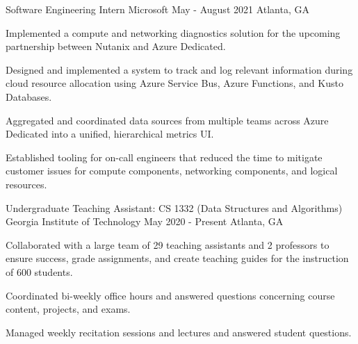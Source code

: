 

\begin{cventries}

\cventry
{Software Engineering Intern}
{Microsoft}
{May - August 2021}
{Atlanta, GA}
{
\begin{cvitems}
    \item Implemented a compute and networking diagnostics solution for the upcoming partnership between Nutanix and Azure Dedicated.
    \item Designed and implemented a system to track and log relevant information during cloud resource allocation
    using Azure Service Bus, Azure Functions, and Kusto Databases.
    \item Aggregated and coordinated data sources from multiple teams across Azure Dedicated
    into a unified, hierarchical metrics UI.
    \item Established tooling for on-call engineers that reduced the time to mitigate
    customer issues for compute components, networking components, and logical resources.
\end{cvitems}
}

\cventry
{Undergraduate Teaching Assistant: CS 1332 (Data Structures and Algorithms)} %
{Georgia Institute of Technology} %
{May 2020 - Present} %
{Atlanta, GA} %
{ %
\begin{cvitems}
    \item Collaborated with a large team of 29 teaching assistants and 2 professors
    to ensure success, grade assignments, and create teaching guides
    for the instruction of 600 students.
    \item Coordinated bi-weekly office hours and answered
    questions concerning course content, projects, and exams.
    \item Managed weekly recitation sessions and lectures and answered student questions.
\end{cvitems}
}



\end{cventries}
